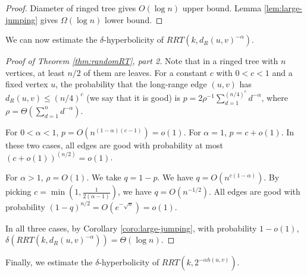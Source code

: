 \documentclass[11pt]{article}
\begin{document}
\begin{proof}
Diameter of ringed tree gives $O(\log n)$ upper bound. Lemma \ref{lem:large-jumping} gives $\Omega(\log n)$ lower bound.
\end{proof}

We can now estimate the $\delta$-hyperbolicity of $RRT(k,d_R(u,v)^{-\alpha})$.

\begin{proof}[Proof of Theorem \ref{thm:randomRT}, part 2]
Note that in a ringed tree with $n$ vertices, at least
	$n/2$ of them are leaves.
For a constant $c$ with $0< c < 1$ and
	a fixed vertex $u$, the probability that the 
	long-range edge $(u,v)$ has $d_R(u,v) \leq (n/4)^c$ 
	(we say that it is good) is $p = 2\rho^{-1}\sum_{d=1}^{(n/4)^c}d^{-\alpha}$,
	where $\rho = \Theta(\sum_{d=1}^n d^{-\alpha})$.

For $0 < \alpha < 1$, $p=O(n^{(1-\alpha)(c-1)})=o(1)$. For $\alpha = 1$, 
	$p=c + o(1)$. 
In these two cases, all edges are good with probability at most 
	$(c + o(1))^{(n/2)}=o(1)$. 

For $\alpha > 1$, $\rho = O(1)$. We take $q=1-p$. We have $q=O(n^{c(1-\alpha)})$. By picking $c = \min(1, \frac{1}{2(\alpha-1)})$, we have $q=O(n^{-1/2})$. All edges are good with probability $(1-q)^{n/2}=O(e^{-\sqrt{n}})=o(1)$.

In all three cases, by Corollary \ref{coro:large-jumping}, with 
	probability $1-o(1)$, $\delta(RRT(k,d_R(u,v)^{-\alpha}))=\Theta(\log n)$. 
\end{proof}

Finally, we estimate the $\delta$-hyperbolicity of $RRT(k,2^{-\alpha h(u,v)})$.

\end{document}
